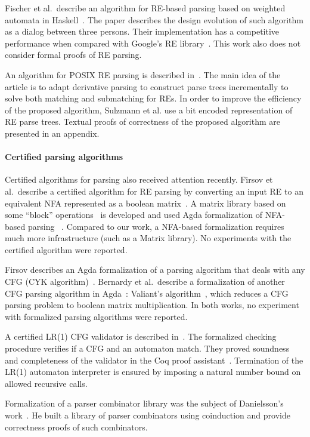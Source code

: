 \documentclass[review]{elsarticle}
\theoremstyle{definition}
\begin{document}
Fischer et al.~describe an algorithm for RE-based parsing based on
weighted automata in Haskell~\cite{Fischer2010}.  The paper describes
the design evolution of such algorithm as a dialog between three
persons. Their implementation has a competitive performance when
compared with Google's RE library~\cite{re2}. This work also does not
consider formal proofs of RE parsing.

An algorithm for POSIX RE parsing is described
in~\cite{SulzmannL14}. The main idea of the article is to adapt
derivative parsing to construct parse trees incrementally to solve
both matching and submatching for REs. In order to improve the
efficiency of the proposed algorithm, Sulzmann et al. use a bit
encoded representation of RE parse trees. Textual proofs of
correctness of the proposed algorithm are presented in an appendix.

\paragraph{Certified parsing algorithms} Certified algorithms for
parsing also received attention recently. Firsov et al.~describe a
certified algorithm for RE parsing by converting an input RE to an
equivalent NFA represented as a boolean matrix~\cite{FirsovU13}. A
matrix library based on some ``block'' operations~\cite{MacedoO13} is
developed and used Agda formalization of NFA-based parsing
~\cite{Norell2009}. Compared to our work, a NFA-based formalization requires
much more infrastructure (such as a Matrix library). No experiments
with the certified algorithm were reported.

Firsov describes an Agda formalization of a parsing algorithm that
deals with any CFG (CYK algorithm)~\cite{Firsov2014}. Bernardy
et al.~describe a formalization of another CFG parsing algorithm in
Agda~\cite{BernardyJ16}: Valiant's algorithm~\cite{Valiant1975}, which
reduces a CFG parsing problem to boolean matrix multiplication. In both works,
no experiment with formalized parsing algorithms were reported.

A certified LR(1) CFG validator is described
in~\cite{Jourdan2012}. The formalized checking procedure verifies if
a CFG and an automaton match. They proved soundness and completeness of
the validator in the Coq proof
assistant~\cite{Bertot2010}. Termination of the LR(1) automaton
interpreter is ensured by imposing a natural number bound on
allowed recursive calls.

Formalization of a parser combinator library was the subject of
Danielsson's work~\cite{Danielsson2010}. He built a library of parser
combinators using coinduction and provide correctness proofs of such
combinators.
\end{document}
